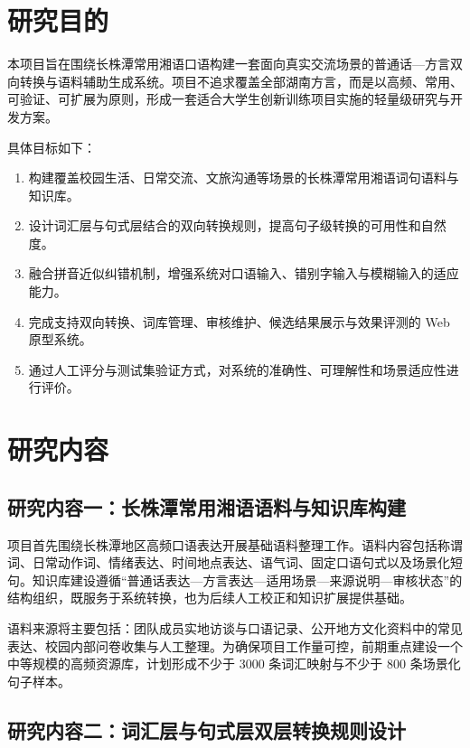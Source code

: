 \documentclass[12pt,a4paper]{ctexart}
\begin{document}
\section{研究目的}

本项目旨在围绕长株潭常用湘语口语构建一套面向真实交流场景的普通话—方言双向转换与语料辅助生成系统。项目不追求覆盖全部湖南方言，而是以高频、常用、可验证、可扩展为原则，形成一套适合大学生创新训练项目实施的轻量级研究与开发方案。

具体目标如下：

\begin{enumerate}
  \item 构建覆盖校园生活、日常交流、文旅沟通等场景的长株潭常用湘语词句语料与知识库。
  \item 设计词汇层与句式层结合的双向转换规则，提高句子级转换的可用性和自然度。
  \item 融合拼音近似纠错机制，增强系统对口语输入、错别字输入与模糊输入的适应能力。
  \item 完成支持双向转换、词库管理、审核维护、候选结果展示与效果评测的 Web 原型系统。
  \item 通过人工评分与测试集验证方式，对系统的准确性、可理解性和场景适应性进行评价。
\end{enumerate}

\section{研究内容}

\subsection{研究内容一：长株潭常用湘语语料与知识库构建}

项目首先围绕长株潭地区高频口语表达开展基础语料整理工作。语料内容包括称谓词、日常动作词、情绪表达、时间地点表达、语气词、固定口语句式以及场景化短句。知识库建设遵循“普通话表达—方言表达—适用场景—来源说明—审核状态”的结构组织，既服务于系统转换，也为后续人工校正和知识扩展提供基础。

语料来源将主要包括：团队成员实地访谈与口语记录、公开地方文化资料中的常见表达、校园内部问卷收集与人工整理。为确保项目工作量可控，前期重点建设一个中等规模的高频资源库，计划形成不少于 3000 条词汇映射与不少于 800 条场景化句子样本。

\subsection{研究内容二：词汇层与句式层双层转换规则设计}
\end{document}
